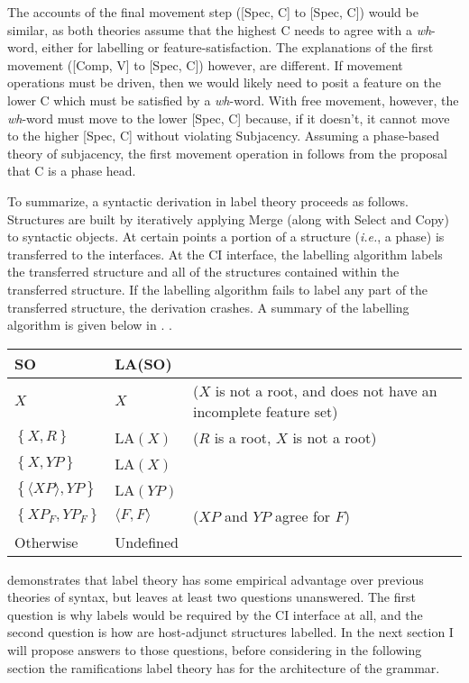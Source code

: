 \documentclass[MilwayThesis]{subfiles}
\begin{document}
The accounts of the final movement step ([Spec, C] to [Spec, C]) would be similar, as both theories assume that the highest C needs to agree with a \textit{wh}-word, either for labelling or feature-satisfaction.
The explanations of the first movement ([Comp, V] to [Spec, C]) however, are different.
If movement operations must be driven, then we would likely need to posit a feature on the lower C which must be satisfied by a \textit{wh}-word.
With free movement, however, the \textit{wh}-word must move to the lower [Spec, C] because, if it doesn't, it cannot move to the higher [Spec, C] without violating Subjacency.
Assuming a phase-based theory of subjacency, the first movement operation in \Last follows from the proposal that C is a phase head.

To summarize, a syntactic derivation in label theory proceeds as follows.
Structures are built by iteratively applying Merge (along with Select and Copy) to syntactic objects.
At certain points a portion of a structure (\textit{i.e.}, a phase) is transferred to the interfaces.
At the CI interface, the labelling algorithm labels the transferred structure and all of the structures contained within the transferred structure.
If the labelling algorithm fails to label any part of the transferred structure, the derivation crashes.
A summary of the labelling algorithm is given below in \Next.
\ex.
\begin{tabular}[t]{lll}
	\textbf{SO} & \textbf{LA(SO)} & \\
	\hline
	$X$ & $X$ & ($X$ is not a root, and does not have an incomplete feature set)\\
	$\left\{ X, R \right\}$ & LA$(X)$ & ($R$ is a root, $X$ is not a root)\\
	$\left\{ X, YP \right\}$ & LA$(X)$ & \\
	$\left\{ \langle XP\rangle, YP \right\}$ & LA$(YP)$ & \\
	$\left\{ XP_F, YP_F \right\}$ & $\langle F,F\rangle$ & ($XP$ and $YP$ agree for $F$)\\
	Otherwise & Undefined &
\end{tabular}

\textcite{chomsky2015problems} demonstrates that label theory has some empirical advantage over previous theories of syntax, but leaves at least two questions unanswered.
The first question is why labels would be required by the CI interface at all, and the second question is how are host-adjunct structures labelled.
In the next section I will propose answers to those questions, before considering in the following section the ramifications label theory has for the architecture of the grammar.
\end{document}
